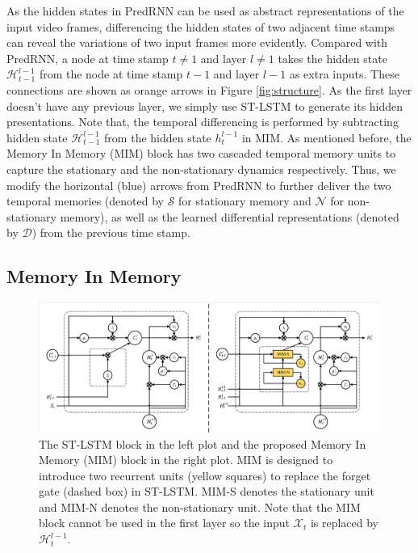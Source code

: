 \documentclass[10pt,twocolumn,letterpaper]{article}
\begin{document}
As the hidden states in PredRNN can be used as abstract representations of the input video frames, differencing the hidden states of two adjacent time stamps can reveal the variations of two input frames more evidently. Compared with PredRNN, a node at time stamp $t \neq 1$ and layer $l \neq 1$ takes the hidden state $\mathcal{H}_{t-1}^{l-1}$ from the node at time stamp $t-1$ and layer $l-1$ as extra inputs. These connections are shown as orange arrows in Figure \ref{fig:structure}. As the first layer doesn't have any previous layer, we simply use ST-LSTM \citep{wang2017predrnn} to generate its hidden presentations. Note that, the temporal differencing is performed by subtracting hidden state $\mathcal{H}_{t-1}^{l-1}$ from the hidden state $h_t^{l-1}$ in MIM. As mentioned before, the Memory In Memory (MIM) block has two cascaded temporal memory units to capture the stationary and the non-stationary dynamics respectively. Thus, we modify the horizontal (blue) arrows from PredRNN to further deliver the two temporal memories (denoted by $\mathcal{S}$ for stationary memory and $\mathcal{N}$ for non-stationary memory), as well as the learned differential representations (denoted by $\mathcal{D}$) from the previous time stamp.

\subsection{Memory In Memory}

\begin{figure}[h]
  \centering
  \includegraphics[width=\textwidth]{fig/node.pdf}
  \caption{The ST-LSTM block \citep{wang2017predrnn} in the left plot and the proposed Memory In Memory (MIM) block in the right plot. MIM is designed to introduce two recurrent units (yellow squares) to replace the forget gate (dashed box) in ST-LSTM. MIM-S denotes the stationary unit and MIM-N denotes the non-stationary unit. Note that the MIM block cannot be used in the first layer so the input $\mathcal{X}_t$ is replaced by $\mathcal{H}_t^{l-1}$.}
  \label{fig:node}
\end{figure}
\end{document}
